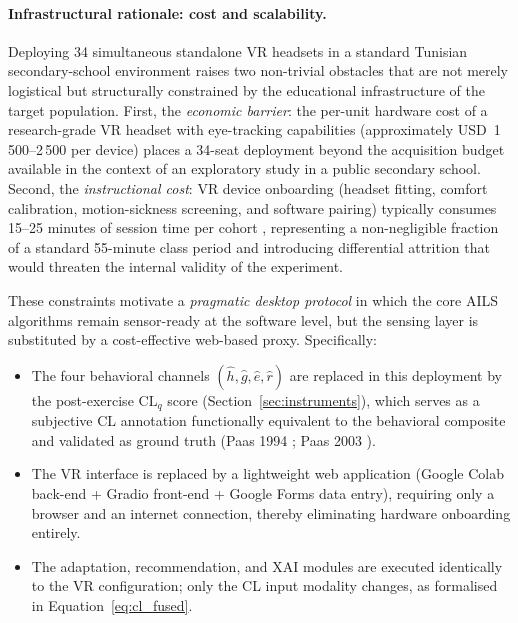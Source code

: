 \documentclass[ASNA,twocolumn]{USG} %
\begin{document}
\paragraph{Infrastructural rationale: cost and scalability.}
Deploying 34 simultaneous standalone VR headsets in a standard
Tunisian secondary-school environment raises two non-trivial obstacles
that are not merely logistical but structurally constrained by the
educational infrastructure of the target population.
First, the \emph{economic barrier}: the per-unit hardware cost of
a research-grade VR headset with eye-tracking capabilities
(approximately USD~1\,500--2\,500 per device) places a 34-seat
deployment beyond the acquisition budget available in the context
of an exploratory study in a public secondary school.
Second, the \emph{instructional cost}: VR device onboarding
(headset fitting, comfort calibration, motion-sickness screening,
and software pairing) typically consumes 15--25 minutes of session
time per cohort \cite{Makransky2021}, representing a non-negligible
fraction of a standard 55-minute class period and introducing
differential attrition that would threaten the internal validity
of the experiment.

These constraints motivate a \emph{pragmatic desktop protocol} in
which the core AILS algorithms remain sensor-ready at the software
level, but the sensing layer is substituted by a cost-effective
web-based proxy. Specifically:
\begin{itemize}
  \item The four behavioral channels
        $(\hat{h}, \hat{g}, \hat{e}, \hat{r})$ are replaced in
        this deployment by the post-exercise $\text{CL}_q$ score
        (Section~\ref{sec:instruments}), which serves as a
        subjective CL annotation functionally equivalent to the
        behavioral composite and validated as ground truth
        (Paas 1994 \cite{Paas1994}; Paas 2003 \cite{Paas2003}).
  \item The VR interface is replaced by a lightweight web
        application (Google Colab back-end + Gradio front-end +
        Google Forms data entry), requiring only a browser and an
        internet connection, thereby eliminating hardware onboarding
        entirely.
  \item The adaptation, recommendation, and XAI modules are
        executed identically to the VR configuration; only the CL
        input modality changes, as formalised in
        Equation~\eqref{eq:cl_fused}.
\end{itemize}
\end{document}
